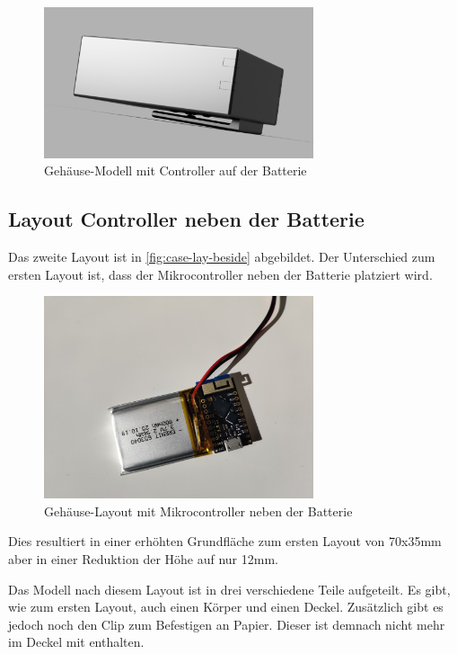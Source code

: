 \begin{figure}[htbp]
	\includegraphics[width=300px]{images/case/high_complete.png}
	\centering
	\caption{Gehäuse-Modell mit Controller auf der Batterie}
	\label{fig:case-high}
\end{figure}

\FloatBarrier

\subsection{Layout Controller neben der Batterie}
Das zweite Layout ist in \autoref{fig:case-lay-beside} abgebildet.
Der Unterschied zum ersten Layout ist, dass der Mikrocontroller neben der Batterie platziert wird.

\begin{figure}[htbp]
	\includegraphics[width=300px]{images/case/pico_beside_battery.jpg}
	\centering
	\caption{Gehäuse-Layout mit Mikrocontroller neben der Batterie}
	\label{fig:case-lay-beside}
\end{figure}

Dies resultiert in einer erhöhten Grundfläche zum ersten Layout von 70x35mm aber in einer Reduktion der Höhe auf nur 12mm.

Das Modell nach diesem Layout ist in drei verschiedene Teile aufgeteilt.
Es gibt, wie zum ersten Layout, auch einen Körper und einen Deckel.
Zusätzlich gibt es jedoch noch den Clip zum Befestigen an Papier.
Dieser ist demnach nicht mehr im Deckel mit enthalten.

